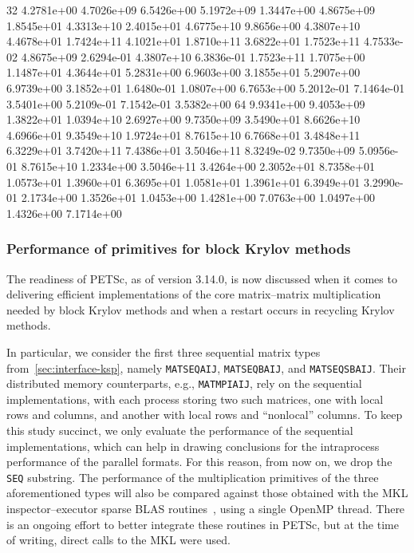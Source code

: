 \documentclass[3p,11pt]{elsarticle}
\newcommand{\pk}[1]{\texttt{#1}}
\begin{document}
{32     4.2781e+00   4.7026e+09 6.5426e+00   5.1972e+09   1.3447e+00   4.8675e+09     1.8545e+01   4.3313e+10    2.4015e+01   4.6775e+10     9.8656e+00   4.3807e+10   4.4678e+01   1.7424e+11    4.1021e+01   1.8710e+11    3.6822e+01   1.7523e+11   4.7533e-02   4.8675e+09   2.6294e-01   4.3807e+10   6.3836e-01   1.7523e+11   1.7075e+00  1.1487e+01   4.3644e+01   5.2831e+00   6.9603e+00  3.1855e+01   5.2907e+00   6.9739e+00    3.1852e+01    1.6480e-01    1.0807e+00    6.7653e+00   5.2012e-01 7.1464e-01   3.5401e+00   5.2109e-01   7.1542e-01   3.5382e+00
64     9.9341e+00   9.4053e+09 1.3822e+01   1.0394e+10   2.6927e+00   9.7350e+09     3.5490e+01   8.6626e+10    4.6966e+01   9.3549e+10     1.9724e+01   8.7615e+10   6.7668e+01   3.4848e+11  6.3229e+01   3.7420e+11  7.4386e+01   3.5046e+11   8.3249e-02   9.7350e+09   5.0956e-01   8.7615e+10   1.2334e+00   3.5046e+11   3.4264e+00  2.3052e+01   8.7358e+01   1.0573e+01   1.3960e+01  6.3695e+01   1.0581e+01   1.3961e+01    6.3949e+01    3.2990e-01    2.1734e+00    1.3526e+01   1.0453e+00 1.4281e+00   7.0763e+00   1.0497e+00   1.4326e+00   7.1714e+00
}\loadedMatProduct
    \subsubsection{Performance of primitives for block Krylov methods}\label{sec:primitives}
The readiness of PETSc, as of version 3.14.0, is now discussed
when it comes to delivering efficient implementations of the core matrix--matrix multiplication
needed by block Krylov methods and when a restart occurs in recycling Krylov methods.

In particular, we consider the first three sequential matrix types from~\cref{sec:interface-ksp}, namely \pk{MATSEQAIJ}, \pk{MATSEQBAIJ}, and \pk{MATSEQSBAIJ}.
Their distributed memory counterparts, e.g., \pk{MATMPIAIJ}, rely on the sequential implementations, with each process
storing two such matrices, one with local rows and columns, and another with local rows and ``nonlocal'' columns.
To keep this study succinct, we only evaluate the performance of the sequential implementations, which can help
in drawing conclusions for the intraprocess performance of the parallel formats.
For this reason, from now on, we drop the \pk{SEQ} substring.
The performance of the multiplication primitives of the three aforementioned types will also be compared against
those obtained with the MKL inspector--executor sparse BLAS routines~\cite{mkl-web-page}, using a single OpenMP thread.
There is an ongoing effort to better integrate these routines in PETSc, but at the time of writing, direct calls to the MKL were used.
\end{document}
